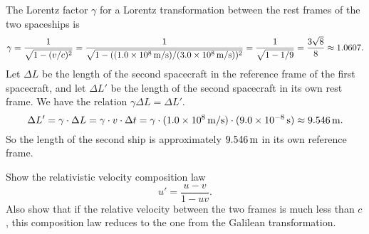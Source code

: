 \documentclass{../../templates/lkx_pset}
\begin{document}
\begin{solution}
	The Lorentz factor $\gamma$ for a Lorentz transformation between the rest frames of the two spaceships is
	\[
		\gamma = \frac{1}{\sqrt{1-(v/c)^2}} = \frac{1}{\sqrt{1- ((\mpssi{1.0e8})/(\mpssi{3.0e8}))^2}} = \frac{1}{\sqrt{1-1/9}} = \frac{3\sqrt{8}}{8} \approx 1.0607.
	\]
	Let $\Delta L$ be the length of the second spacecraft in the reference frame of the first spacecraft, and let $\Delta L'$ be the length of the second spacecraft in its own rest frame. We have the relation $\gamma \Delta L = \Delta L'$.
	\[
		\Delta L' = \gamma\cdot \Delta L = \gamma\cdot v\cdot \Delta t = \gamma\cdot (\mpssi{1.0e8})\cdot (\ssi{9.0e-8}) \approx \msi{9.546}.
	\]
	So the length of the second ship is approximately $\msi{9.546}$ in its own reference frame.
\end{solution}

\begin{problem}{4}
Show the relativistic velocity composition law
\[
	u' = \frac{u - v}{1-uv}.
\]
Also show that if the relative velocity between the two frames is much less than $c$, this composition law reduces to the one from the Galilean transformation.
\end{problem}
\end{document}
